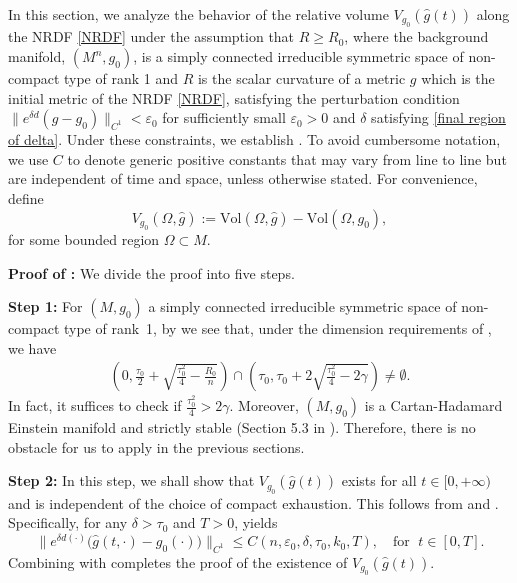\documentclass[12pt]{amsart}
\begin{document}
In this section, we analyze the behavior of the relative volume $V_{g_0}(\hat{g}(t))$ along the NRDF \eqref{NRDF} under the assumption that $R \geq R_0$, where the background manifold, $(M^n, g_0)$, is a simply connected irreducible symmetric space of non-compact type of rank 1 and $R$ is the scalar curvature of a metric $g$ which is the initial metric of the NRDF \eqref{NRDF}, satisfying the perturbation condition $\|e^{\delta d}(g - g_0)\|_{C^1} < \varepsilon_0$ for sufficiently small $\varepsilon_0 > 0$ and $\delta$ satisfying \eqref{final region of delta}. Under these constraints, we establish . To avoid cumbersome notation, we use $C$ to denote generic positive constants that may vary from line to line but are independent of time and space, unless otherwise stated. For convenience, define
\begin{equation}\label{definition of partial relative volume}
    V_{g_0}(\Omega, \hat{g}) := \mathrm{Vol}(\Omega, \hat{g}) - \mathrm{Vol}(\Omega, g_0),
\end{equation}
for some bounded region $\Omega \subset M$. 

\textbf{Proof of : } We divide the proof into five steps. 

\textbf{Step 1:} For $(M, g_0)$ a simply connected irreducible symmetric space of non-compact type of rank~1, by  we see that, under the dimension requirements of , we have
\begin{align}\label{key intersection set 1}
    \left(0, \frac{\tau_0}{2} + \sqrt{\frac{\tau_0^2}{4} - \frac{R_0}{n}} \right) \cap \left( \tau_0, \tau_0 + 2\sqrt{\frac{\tau_0^2}{4} - 2\gamma} \right)\neq \emptyset. 
\end{align}
In fact, it suffices to check if $\frac{\tau_0^2}{4} > 2\gamma$. Moreover, $(M, g_0)$ is a Cartan-Hadamard Einstein manifold and strictly stable (Section 5.3 in \cite{Ba2015}). Therefore, there is no obstacle for us to apply  in the previous sections. 

\textbf{Step 2: } In this step, we shall show that $V_{g_0}(\hat g(t))$ exists for all $t\in[0,+\infty)$ and is independent of the choice of compact exhaustion. This follows from  and . Specifically, for any $\delta>\tau_0$ and $T>0$,  yields
\begin{equation}\label{final proof formula 0}
\|e^{\delta d(\cdot)}\bigl(\hat{g}(t, \cdot)-g_0(\cdot)\bigr)\|_{C^1}
\le C(n,\varepsilon_0,\delta,\tau_0,k_0,T),
\quad \text{for }\; t\in[0,T].
\end{equation}
Combining with  completes the proof of the existence of $V_{g_0}(\hat{g}(t))$.
\end{document}
